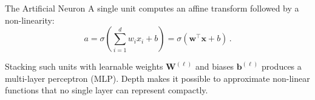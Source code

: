 \begin{frame}{The Artificial Neuron}
    A single unit computes an affine transform followed by a non-linearity:
    \begin{equation*}
        a = \sigma\left(\sum_{i=1}^{d} w_i x_i + b\right) = \sigma(\mathbf{w}^\top \mathbf{x} + b)\,.
    \end{equation*}
    \begin{center}
    \end{center}
    Stacking such units with learnable weights $\mathbf{W}^{(\ell)}$ and biases $\mathbf{b}^{(\ell)}$ produces a multi-layer perceptron (MLP). Depth makes it possible to approximate non-linear functions that no single layer can represent compactly.
\end{frame}

